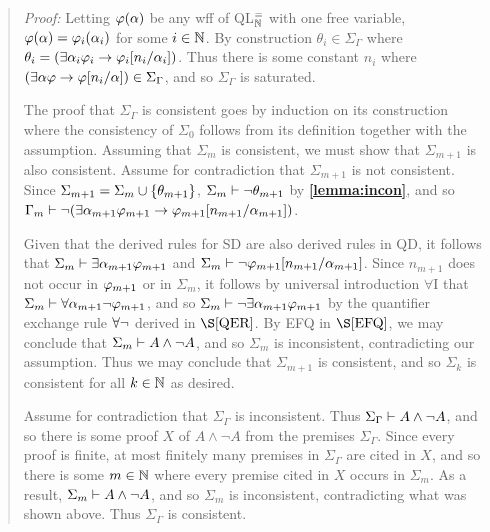 \begin{quote} 
  \textit{Proof:} 
  Letting $\varphi(\alpha)$ be any wff of QL$^=_{\mathbb{N}}$ with one free variable, $\varphi(\alpha)=\varphi_i(\alpha_i)$ for some $i\in\mathbb{N}$.
  By construction $\theta_i\in\Sigma_\Gamma$ where $\theta_i=(\exists \alpha_i\varphi_i \rightarrow \varphi_i[n_i/\alpha_i])$.
  Thus there is some constant $n_i$ where $(\exists \alpha\varphi \rightarrow \varphi[n_i/\alpha])\in\Sigma_\Gamma$, and so $\Sigma_\Gamma$ is saturated. 

  The proof that $\Sigma_\Gamma$ is consistent goes by induction on its construction where the consistency of $\Sigma_0$ follows from its definition together with the assumption.
  Assuming that $\Sigma_m$ is consistent, we must show that $\Sigma_{m+1}$ is also consistent. 
  Assume for contradiction that $\Sigma_{m+1}$ is not consistent.
  Since $\Sigma_{m+1}=\Sigma_m\cup\lbrace\theta_{m+1}\rbrace$, $\Sigma_m\vdash \neg\theta_{m+1}$ by \textbf{\ref{lemma:incon}}, and so $\Gamma_m\vdash\neg(\exists \alpha_{m+1}\varphi_{m+1}\rightarrow \varphi_{m+1}[n_{m+1}/\alpha_{m+1}])$.

  Given that the derived rules for SD are also derived rules in QD, it follows that $\Sigma_m\vdash \exists \alpha_{m+1}\varphi_{m+1}$ and $\Sigma_m\vdash\neg\varphi_{m+1}[n_{m+1}/\alpha_{m+1}]$.
  Since $n_{m+1}$ does not occur in $\varphi_{m+1}$ or in $\Sigma_m$, it follows by universal introduction $\forall$I that $\Sigma_m\vdash \forall \alpha_{m+1}\neg\varphi_{m+1}$, and so $\Sigma_m\vdash \neg\exists \alpha_{m+1}\varphi_{m+1}$ by the quantifier exchange rule $\forall\neg$ derived in $\S\ref{QER}$.
  By EFQ in $\S\ref{EFQ}$, we may conclude that $\Sigma_m\vdash A\wedge\neg A$, and so $\Sigma_m$ is inconsistent, contradicting our assumption. 
  Thus we may conclude that $\Sigma_{m+1}$ is consistent, and so $\Sigma_k$ is consistent for all $k\in\mathbb{N}$ as desired.

  Assume for contradiction that $\Sigma_\Gamma$ is inconsistent. 
  Thus $\Sigma_\Gamma\vdash A\wedge\neg A$, and so there is some proof $X$ of $A\wedge\neg A$ from the premises $\Sigma_\Gamma$.
  Since every proof is finite, at most finitely many premises in $\Sigma_\Gamma$ are cited in $X$, and so there is some $m\in\mathbb{N}$ where every premise cited in $X$ occurs in $\Sigma_m$.
  As a result, $\Sigma_m\vdash A\wedge\neg A$, and so $\Sigma_m$ is inconsistent, contradicting what was shown above. 
  Thus $\Sigma_\Gamma$ is consistent. 
\end{quote}





